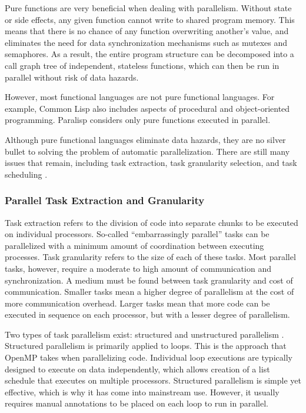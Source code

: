 \documentclass[
abstracton,
fontsize=12pt,
]{scrartcl}
\begin{document}
Pure functions are very beneficial when dealing with parallelism. Without state or side effects, any given function cannot write to shared program memory. This means that there is no chance of any function overwriting another's value, and eliminates the need for data synchronization mechanisms such as mutexes and semaphores. As a result, the entire program structure can be decomposed into a call graph tree of independent, stateless functions, which can then be run in parallel without risk of data hazards.

However, most functional languages are not pure functional languages. For example, Common Lisp also includes aspects of procedural and object-oriented programming. Paralisp considers only pure functions executed in parallel.

Although pure functional languages eliminate data hazards, they are no silver bullet to solving the problem of automatic parallelization. There are still many issues that remain, including task extraction, task granularity selection, and task scheduling \autocites{Girkar:1995:ETP:210184.210189}{improving-task-scheduling}.

\subsubsection{Parallel Task Extraction and Granularity}

Task extraction refers to the division of code into separate chunks to be executed on individual processors. So-called ``embarrassingly parallel'' tasks can be parallelized with a minimum amount of coordination between executing processes. Task granularity refers to the size of each of these tasks. Most parallel tasks, however, require a moderate to high amount of communication and synchronization. A medium must be found between task granularity and cost of communication. Smaller tasks mean a higher degree of parallelism at the cost of more communication overhead. Larger tasks mean that more code can be executed in sequence on each processor, but with a lesser degree of parallelism.

Two types of task parallelism exist: structured and unstructured parallelism \autocite{Girkar:1995:ETP:210184.210189}. Structured parallelism is primarily applied to loops. This is the approach that OpenMP takes when parallelizing code. Individual loop executions are typically designed to execute on data independently, which allows creation of a list schedule that executes on multiple processors. Structured parallelism is simple yet effective, which is why it has come into mainstream use. However, it usually requires manual annotations to be placed on each loop to run in parallel.
\end{document}
